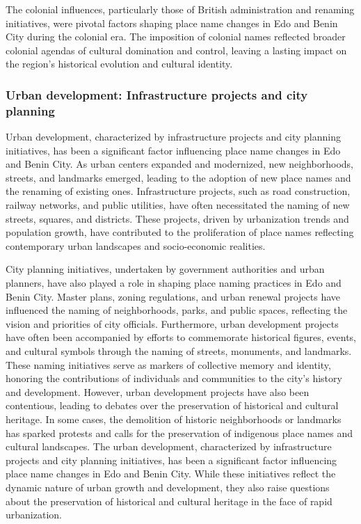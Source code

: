 The colonial influences, particularly those of British administration and renaming initiatives, were pivotal factors shaping place name changes in Edo and Benin City during the colonial era. The imposition of colonial names reflected broader colonial agendas of cultural domination and control, leaving a lasting impact on the region's historical evolution and cultural identity\cite{aigimoukhuede2018benin}.

\subsubsection{Urban development: Infrastructure projects and city planning}

Urban development, characterized by infrastructure projects and city planning initiatives, has been a significant factor influencing place name changes in Edo and Benin City. As urban centers expanded and modernized, new neighborhoods, streets, and landmarks emerged, leading to the adoption of new place names and the renaming of existing ones\cite{nwokeji2010deatlanticizing,aigimoukhuede2018benin}.
Infrastructure projects, such as road construction, railway networks, and public utilities, have often necessitated the naming of new streets, squares, and districts. These projects, driven by urbanization trends and population growth, have contributed to the proliferation of place names reflecting contemporary urban landscapes and socio-economic realities.

City planning initiatives, undertaken by government authorities and urban planners, have also played a role in shaping place naming practices in Edo and Benin City. Master plans, zoning regulations, and urban renewal projects have influenced the naming of neighborhoods, parks, and public spaces, reflecting the vision and priorities of city officials\cite{bigon2009history}.
Furthermore, urban development projects have often been accompanied by efforts to commemorate historical figures, events, and cultural symbols through the naming of streets, monuments, and landmarks. These naming initiatives serve as markers of collective memory and identity, honoring the contributions of individuals and communities to the city's history and development\cite{nwokeji2010deatlanticizing}.
However, urban development projects have also been contentious, leading to debates over the preservation of historical and cultural heritage. In some cases, the demolition of historic neighborhoods or landmarks has sparked protests and calls for the preservation of indigenous place names and cultural landscapes\cite{nwokeji2010deatlanticizing}.
The urban development, characterized by infrastructure projects and city planning initiatives, has been a significant factor influencing place name changes in Edo and Benin City. While these initiatives reflect the dynamic nature of urban growth and development, they also raise questions about the preservation of historical and cultural heritage in the face of rapid urbanization\cite{aigimoukhuede2018benin}.
